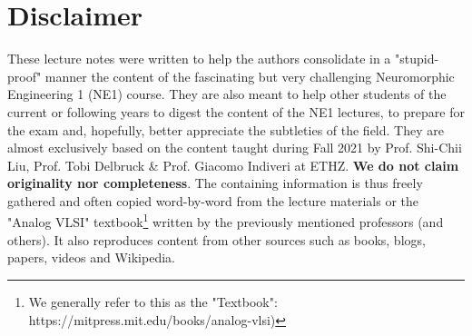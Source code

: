 \documentclass[main]{subfiles}
\begin{document}
\section*{Disclaimer}
These lecture notes were written to help the authors consolidate in a "stupid-proof" manner the content of the fascinating but very challenging Neuromorphic Engineering 1 (NE1) course. They are also meant to help other students of the current or following years to digest the content of the NE1 lectures, to prepare for the exam and, hopefully,  better appreciate the subtleties of the field. They are almost exclusively based on the content taught during Fall 2021 by Prof. Shi-Chii Liu, Prof. Tobi Delbruck & Prof. Giacomo Indiveri at ETHZ. \textbf{We do not claim originality nor completeness}. The containing information is thus freely gathered and often copied word-by-word from the lecture materials or the "Analog VLSI" textbook\footnote{We generally refer to this as the "Textbook": https://mitpress.mit.edu/books/analog-vlsi)} written by the previously mentioned professors (and others). It also reproduces content from other sources such as books, blogs, papers, videos and Wikipedia. 
\end{document}
